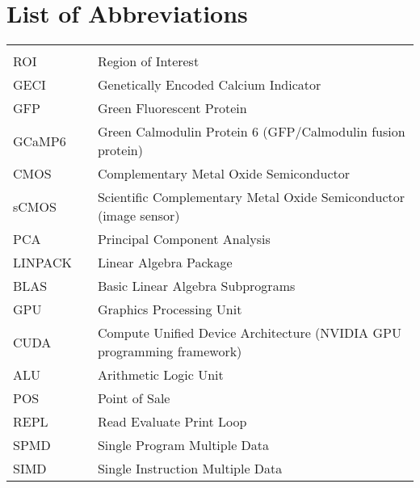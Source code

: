 \hypertarget{list-of-abbreviations}{%
\chapter*{List of Abbreviations}\label{list-of-abbreviations}}

\begin{center}
    \begin{tabular}{lll}
        \hspace*{2em}    & \hspace*{1in} & \hspace*{4.5in}                        \\
      ROI               & \dotfill      & Region of Interest  \\
      GECI               & \dotfill      & Genetically Encoded Calcium Indicator  \\
      GFP               & \dotfill      & Green Fluorescent Protein \\
      GCaMP6               & \dotfill      & Green Calmodulin Protein 6 (GFP/Calmodulin fusion protein) \\
      CMOS               & \dotfill      & Complementary Metal Oxide Semiconductor  \\
      sCMOS               & \dotfill      & Scientific Complementary Metal Oxide Semiconductor (image sensor) \\
      PCA               & \dotfill      & Principal Component Analysis  \\
      LINPACK               & \dotfill      & Linear Algebra Package  \\
      BLAS               & \dotfill      & Basic Linear Algebra Subprograms \\
      GPU               & \dotfill      & Graphics Processing Unit  \\
      CUDA               & \dotfill      & Compute Unified Device Architecture (NVIDIA GPU programming framework) \\
      ALU               & \dotfill      & Arithmetic Logic Unit \\
      POS               & \dotfill      & Point of Sale \\
      REPL               & \dotfill      & Read Evaluate Print Loop \\
      SPMD               & \dotfill      & Single Program Multiple Data \\
      SIMD               & \dotfill      & Single Instruction Multiple Data \\

\end{tabular}
\end{center}
